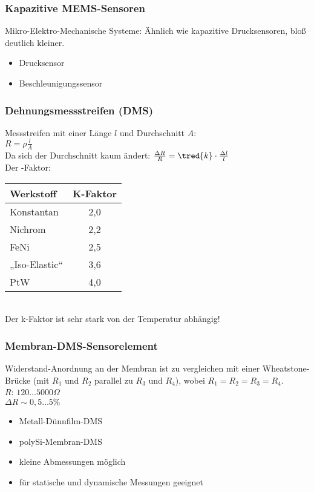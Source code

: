 \documentclass{scrreprt}
\begin{document}
\subsubsection{Kapazitive MEMS-Sensoren}
Mikro-Elektro-Mechanische Systeme: Ähnlich wie kapazitive Drucksensoren, bloß deutlich kleiner.
\begin{itemize}
\item Drucksensor
\item Beschleunigungssensor
\end{itemize}

\subsubsection{Dehnungsmessstreifen (DMS)}
Messstreifen mit einer Länge $l$ und Durchschnitt $A$:\\
$R=\rho \frac{l}{A}$\\
Da sich der Durchschnitt kaum ändert: $\frac{\Delta R}{R}=\tred{k}\cdot \frac{\Delta l}{l}$\\
Der -Faktor:\\
\begin{tabular}{l | c}
Werkstoff & K-Faktor\\\hline
Konstantan & 2,0\\
Nichrom & 2,2\\
FeNi & 2,5\\
„Iso-Elastic“ & 3,6\\
PtW & 4,0
\end{tabular}\\
Der k-Faktor ist sehr stark von der Temperatur abhängig!

\subsubsection*{Membran-DMS-Sensorelement}
Widerstand-Anordnung an der Membran ist zu vergleichen mit einer Wheatstone-Brücke (mit $R_1$ und $R_2$ parallel zu $R_3$ und $R_4$), wobei $R_1=R_2=R_3=R_4$.\\
$R$: $120\dots5000\unit{\Omega}$\\
$\Delta R \sim 0,5\dots 5\%$
\begin{itemize}
\item Metall-Dünnfilm-DMS
\item polySi-Membran-DMS
\end{itemize}
\begin{itemize}[label=$+$]
\item kleine Abmessungen möglich
\item für statische und dynamische Messungen geeignet
\end{itemize}
\end{document}
